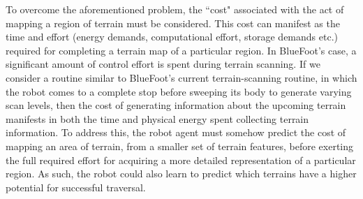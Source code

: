 	To overcome the aforementioned problem, the ``cost" associated with the act of mapping a region of terrain must be considered. This cost can manifest as the time and effort (energy demands, computational effort, storage demands etc.) required for completing a terrain map of a particular region. In BlueFoot's case, a significant amount of control effort is spent during terrain scanning. If we consider a routine similar to BlueFoot's current terrain-scanning routine, in which the robot comes to a complete stop before sweeping its body to generate varying scan levels, then the cost of generating information about the upcoming terrain  manifests in both the time and physical energy spent collecting terrain information. To address this, the robot agent must somehow predict the cost of mapping an area of terrain, from a smaller set of terrain features, before exerting the full required effort for acquiring a more detailed representation of a particular region. As such, the robot could also learn to predict which terrains have a higher potential for successful traversal. %